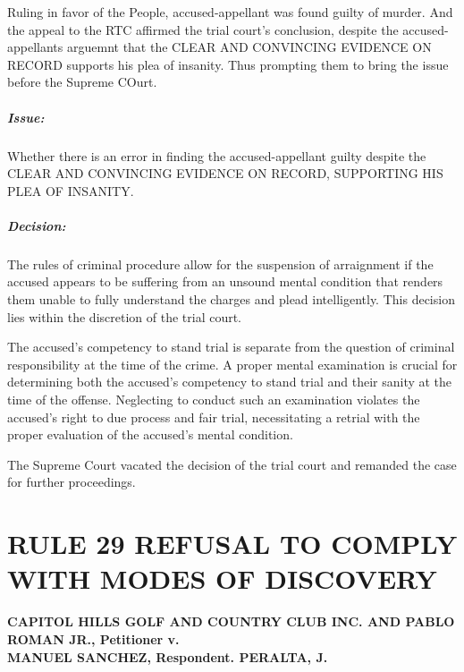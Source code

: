 \documentclass[
12pt,
oneside,
onehalfspacing,
headsepline
]{DigestCollection}
\begin{document}
Ruling in favor of the People, accused-appellant was found guilty of murder. And the appeal to the RTC affirmed the trial court's conclusion, despite the accused-appellants arguemnt that the CLEAR AND CONVINCING EVIDENCE ON RECORD supports his plea of insanity. Thus prompting them to bring the issue before the Supreme COurt. 

\paragraph{Issue:}
\label{4602fc10-0f91-11ef-a737-5534cab7361b}


Whether there is an error in finding the accused-appellant guilty despite the CLEAR AND CONVINCING EVIDENCE ON RECORD, SUPPORTING HIS PLEA OF INSANITY.

\paragraph{Decision:}
\label{488bf0e0-0f91-11ef-a737-5534cab7361b}


The rules of criminal procedure allow for the suspension of arraignment if the accused appears to be suffering from an unsound mental condition that renders them unable to fully understand the charges and plead intelligently. This decision lies within the discretion of the trial court.

The accused's competency to stand trial is separate from the question of criminal responsibility at the time of the crime. A proper mental examination is crucial for determining both the accused's competency to stand trial and their sanity at the time of the offense. Neglecting to conduct such an examination violates the accused's right to due process and fair trial, necessitating a retrial with the proper evaluation of the accused's mental condition.

The Supreme Court vacated the decision of the trial court and remanded the case for further proceedings. 

\chapter{RULE 29 REFUSAL TO COMPLY \\WITH MODES OF DISCOVERY}
\label{6e276ad0-0a16-11ef-932c-63c852f65e48}


\label{ccb31830-0a2d-11ef-a1a5-03b0bde1fccf}


\noindent\textbf{CAPITOL HILLS GOLF AND COUNTRY CLUB INC. AND PABLO ROMAN JR., Petitioner v. \\MANUEL SANCHEZ, Respondent. PERALTA, J.}\vspace{0.4cm}
\end{document}
